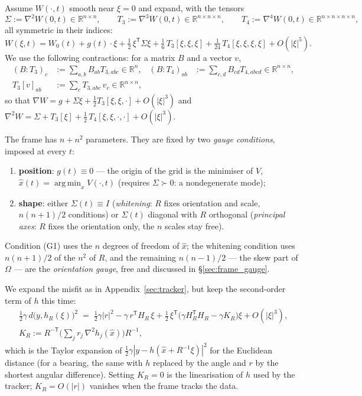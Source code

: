 \documentclass[11pt,a4paper]{article}
\newcommand{\R}{\mathbb{R}}
\newcommand{\argmin}{\operatorname{arg\,min}}
\newcommand{\T}{^{\mathsf T}}
\newcommand{\xh}{\hat{x}}
\newcommand{\abs}[1]{\left\lvert #1 \right\rvert}
\newcommand{\grad}{\nabla}
\theoremstyle{plain}
\theoremstyle{definition}
\theoremstyle{remark}
\begin{document}
Assume $W(\cdot,t)$ smooth near $\xi=0$ and expand, with the tensors
\[
  \Sigma := \grad^2W(0,t)\in\R^{n\times n}, \qquad T_3 := \grad^3W(0,t)\in\R^{n\times n\times n}, \qquad T_4 := \grad^4W(0,t)\in\R^{n\times n\times n\times n},
\]
all symmetric in their indices:
\begin{equation}
  W(\xi,t) = W_0(t) + g(t)\cdot\xi + \tfrac12\,\xi\T\Sigma\xi + \tfrac16\,T_3[\xi,\xi,\xi] + \tfrac1{24}\,T_4[\xi,\xi,\xi,\xi] + O(\abs\xi^5).
  \label{eq:frame_taylor}
\end{equation}
We use the following contractions: for a matrix $B$ and a vector $v$,
\begin{align*}
  (B\!:\!T_3)_c &:= \sum_{a,b}B_{ab}T_{3,abc}\in\R^n, &
  (B\!:\!T_4)_{ab} &:= \sum_{c,d}B_{cd}T_{4,abcd}\in\R^{n\times n}, \\
  T_3[v]_{ab} &:= \sum_cT_{3,abc}\,v_c\in\R^{n\times n}, &&
\end{align*}
so that $\grad W = g + \Sigma\xi + \tfrac12T_3[\xi,\xi,\cdot] + O(\abs\xi^3)$ and $\grad^2W = \Sigma + T_3[\xi] + \tfrac12\,T_4[\xi,\xi,\cdot,\cdot] + O(\abs\xi^3)$.

The frame has $n+n^2$ parameters. They are fixed by two \emph{gauge conditions}, imposed at every $t$:
\begin{enumerate}[nosep,label=(G\arabic*)]
  \item \textbf{position}: $g(t)\equiv0$ --- the origin of the grid is the minimiser of $V$, $\xh(t) = \argmin_xV(\cdot,t)$ (requires $\Sigma\succ0$: a nondegenerate mode);
  \item \textbf{shape}: either $\Sigma(t)\equiv I$ (\emph{whitening}: $R$ fixes orientation and scale, $n(n+1)/2$ conditions) or $\Sigma(t)$ diagonal with $R$ orthogonal (\emph{principal axes}: $R$ fixes the orientation only, the $n$ scales stay free).
\end{enumerate}
Condition (G1) uses the $n$ degrees of freedom of $\xh$; the whitening condition uses $n(n+1)/2$ of the $n^2$ of $R$, and the remaining $n(n-1)/2$ --- the skew part of $\Omega$ --- are the \emph{orientation gauge}, free and discussed in \S\ref{sec:frame_gauge}.

We expand the misfit as in Appendix~\ref{sec:tracker}, but keep the second-order term of $h$ this time:
\begin{equation}
\begin{gathered}
  \tfrac12\gamma\,d\big(y,h_R(\xi)\big)^2 \;=\; \tfrac12\gamma\abs r^2 - \gamma\,r\T H_R\,\xi + \tfrac12\,\xi\T\big(\gamma H_R\T H_R - \gamma K_R\big)\xi + O(\abs\xi^3), \\
  K_R := R^{-\mathsf T}\Big(\sum_j r_j\,\grad^2h_j(\xh)\Big)R^{-1},
\end{gathered}
  \label{eq:frame_misfit}
\end{equation}
which is the Taylor expansion of $\tfrac12\gamma\abs{y-h(\xh+R^{-1}\xi)}^2$ for the Euclidean distance (for a bearing, the same with $h$ replaced by the angle and $r$ by the shortest angular difference). Setting $K_R=0$ is the linearisation of $h$ used by the tracker; $K_R = O(\abs r)$ vanishes when the frame tracks the data.
\end{document}
